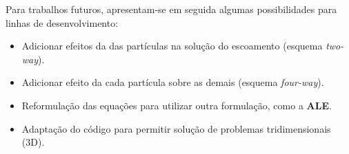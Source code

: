 Para trabalhos futuros, apresentam-se em seguida algumas possibilidades para linhas de desenvolvimento:
\begin{itemize}
	\item Adicionar efeitos da das partículas na solução do escoamento (esquema \textit{two-way}).
	\item Adicionar efeito da cada partícula sobre as demais (esquema \textit{four-way}).
	\item Reformulação das equações para utilizar outra formulação, como a \textbf{ALE}.
	\item Adaptação do código para permitir solução de problemas tridimensionais (3D).
\end{itemize}
